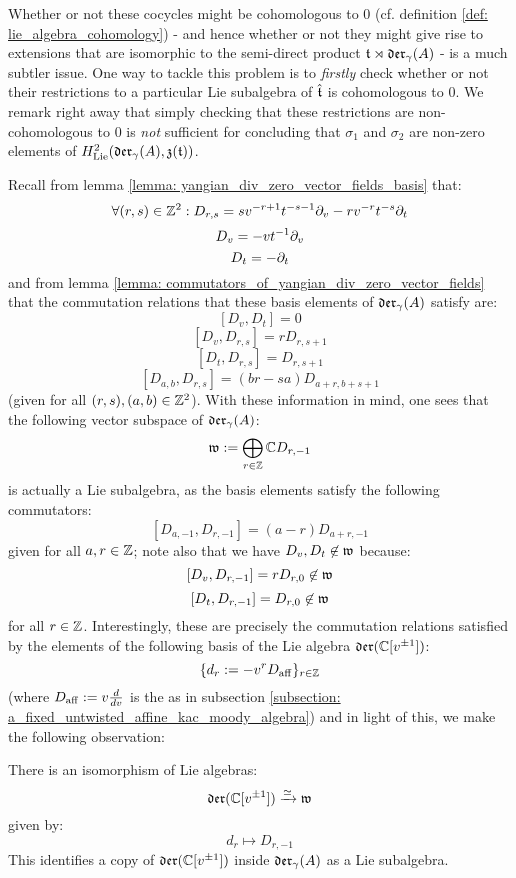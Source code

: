         Whether or not these cocycles might be cohomologous to $0$ (cf. definition \ref{def: lie_algebra_cohomology}) - and hence whether or not they might give rise to extensions that are isomorphic to the semi-direct product $\mathfrak{t} \rtimes \mathfrak{der}_{\gamma}(A)$ - is a much subtler issue. One way to tackle this problem is to \textit{firstly} check whether or not their restrictions to a particular Lie subalgebra of $\hat{\mathfrak{t}}$ is cohomologous to $0$. We remark right away that simply checking that these restrictions are non-cohomologous to $0$ is \textit{not} sufficient for concluding that $\sigma_1$ and $\sigma_2$ are non-zero elements of $H^2_{\mathrm{Lie}}(\mathfrak{der}_{\gamma}(A), \mathfrak{z}(\mathfrak{t}))$.
        
        Recall from lemma \ref{lemma: yangian_div_zero_vector_fields_basis} that:
            $$\forall (r, s) \in \mathbb{Z}^2: D_{r, s} = s v^{-r + 1} t^{-s - 1} \partial_v - r v^{-r} t^{-s} \partial_t$$
            $$D_v = -v t^{-1} \partial_v$$
            $$D_t = -\partial_t$$
        and from lemma \ref{lemma: commutators_of_yangian_div_zero_vector_fields} that the commutation relations that these basis elements of $\mathfrak{der}_{\gamma}(A)$ satisfy are:
            $$[D_v, D_t] = 0$$
            $$[D_v, D_{r, s}] = r D_{r, s + 1}$$
            $$[D_t, D_{r, s}] = D_{r, s + 1}$$
            $$[D_{a, b}, D_{r, s}] = (br - sa) D_{a + r, b + s + 1}$$
        (given for all $(r, s), (a, b) \in \mathbb{Z}^2$). With these information in mind, one sees that the following vector subspace of $\mathfrak{der}_{\gamma}(A)$:
            $$\mathfrak{w} := \bigoplus_{r \in \mathbb{Z}} \mathbb{C} D_{r, -1}$$
        is actually a Lie subalgebra, as the basis elements satisfy the following commutators:
            $$[D_{a, -1}, D_{r, -1}] = (a - r) D_{a + r, -1}$$
        given for all $a, r \in \mathbb{Z}$; note also that we have $D_v, D_t \not \in \mathfrak{w}$ because:
            $$[D_v, D_{r, -1}] = r D_{r, 0} \not \in \mathfrak{w}$$
            $$[D_t, D_{r, -1}] = D_{r, 0} \not \in \mathfrak{w}$$    
        for all $r \in \mathbb{Z}$. Interestingly, these are precisely the commutation relations satisfied by the elements of the following basis of the Lie algebra $\mathfrak{der}(\mathbb{C}[v^{\pm 1}])$:
            $$\{ d_r := -v^r D_{\mathrm{aff}} \}_{r \in \mathbb{Z}}$$
        (where $D_{\mathrm{aff}} := v \frac{d}{dv}$ is the  as in subsection \ref{subsection: a_fixed_untwisted_affine_kac_moody_algebra}) and in light of this, we make the following observation:
        \begin{lemma} \label{lemma: a_copy_of_the_witt_algebra_inside_the_lie_algebra_of_yangian_div_zero_vector_fields}
            There is an isomorphism of Lie algebras:
                $$\mathfrak{der}(\mathbb{C}[v^{\pm 1}]) \xrightarrow[]{\simeq} \mathfrak{w}$$
            given by:
                $$d_r \mapsto D_{r, -1}$$
            This identifies a copy of $\mathfrak{der}(\mathbb{C}[v^{\pm 1}])$ inside $\mathfrak{der}_{\gamma}(A)$ as a Lie subalgebra. 
        \end{lemma}

